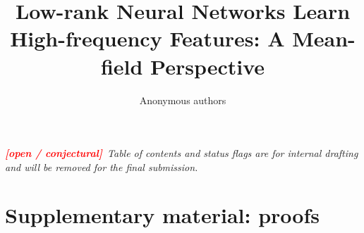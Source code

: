 \documentclass{article} %
\title{Low-rank Neural Networks Learn High-frequency Features: A Mean-field Perspective}
\author{Anonymous authors}
\newcommand{\openflag}{\textcolor{red}{\textbf{[open / conjectural]}}}
\renewcommand{\1}{\mathbbm{1}}
\begin{document}
\maketitle

\begin{abstract}

\end{abstract}

\noindent\textit{\openflag\ Table of contents and status flags are for internal drafting and will be removed for the final submission.}
\tableofcontents






\appendix
\section{Supplementary material: proofs}
\label{app:proofs}

\end{document}
